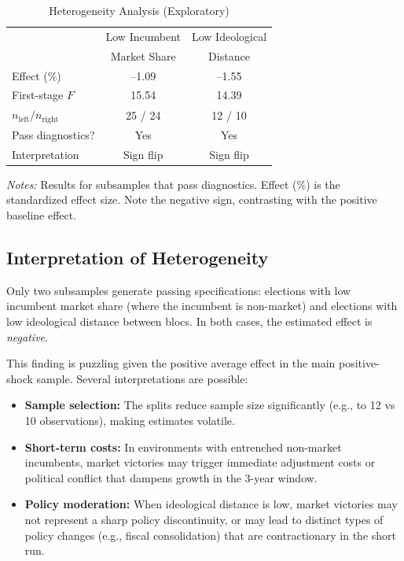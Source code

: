 \documentclass[12pt,a4paper]{article}
\begin{document}
\begin{table}[H]
\centering
\caption{Heterogeneity Analysis (Exploratory)}
\label{tab:heterogeneity}
\begin{threeparttable}
\begin{tabular}{lcc}
\toprule
 & Low Incumbent & Low Ideological \\
 & Market Share & Distance \\
\midrule
Effect (\%) & --1.09 & --1.55 \\
First-stage $F$ & 15.54 & 14.39 \\
$n_{\text{left}} / n_{\text{right}}$ & 25 / 24 & 12 / 10 \\
Pass diagnostics? & Yes & Yes \\
\midrule
Interpretation & Sign flip & Sign flip \\
\bottomrule
\end{tabular}
\begin{tablenotes}
\small
\item \textit{Notes:} Results for subsamples that pass diagnostics. 
Effect (\%) is the standardized effect size. Note the negative sign, 
contrasting with the positive baseline effect.
\end{tablenotes}
\end{threeparttable}
\end{table}

\subsection{Interpretation of Heterogeneity}

Only two subsamples generate passing specifications: elections with low 
incumbent market share (where the incumbent is non-market) and elections 
with low ideological distance between blocs. In both cases, the estimated 
effect is \textit{negative}.

This finding is puzzling given the positive average effect in the main 
positive-shock sample. Several interpretations are possible:
\begin{itemize}
    \item \textbf{Sample selection:} The splits reduce sample size significantly 
    (e.g., to 12 vs 10 observations), making estimates volatile.
    \item \textbf{Short-term costs:} In environments with entrenched 
    non-market incumbents, market victories may trigger immediate adjustment 
    costs or political conflict that dampens growth in the 3-year window.
    \item \textbf{Policy moderation:} When ideological distance is low, 
    market victories may not represent a sharp policy discontinuity, or 
    may lead to distinct types of policy changes (e.g., fiscal consolidation) 
    that are contractionary in the short run.
\end{itemize}
\end{document}
